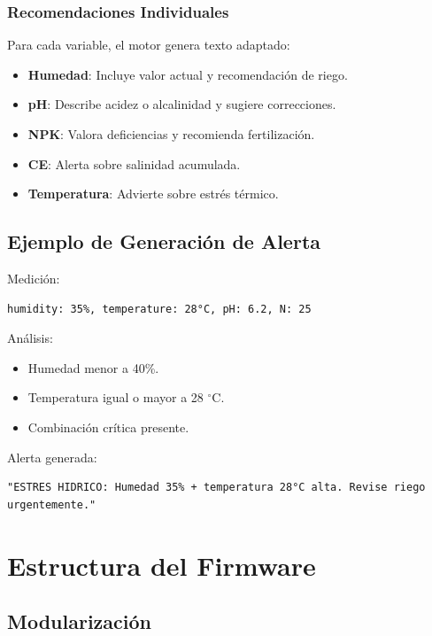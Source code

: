 \documentclass[journal]{IEEEtran}
\begin{document}
\subsubsection{Recomendaciones Individuales}

Para cada variable, el motor genera texto adaptado:

\begin{itemize}
\item \textbf{Humedad}: Incluye valor actual y recomendación de riego.
\item \textbf{pH}: Describe acidez o alcalinidad y sugiere correcciones.
\item \textbf{NPK}: Valora deficiencias y recomienda fertilización.
\item \textbf{CE}: Alerta sobre salinidad acumulada.
\item \textbf{Temperatura}: Advierte sobre estrés térmico.
\end{itemize}

\subsection{Ejemplo de Generación de Alerta}

Medición:

\begin{lstlisting}[basicstyle=\ttfamily\scriptsize,breaklines=true]
humidity: 35%, temperature: 28°C, pH: 6.2, N: 25
\end{lstlisting}

Análisis:

\begin{itemize}
\item Humedad menor a 40\%.
\item Temperatura igual o mayor a 28 $^\circ$C.
\item Combinación crítica presente.
\end{itemize}

Alerta generada:

\begin{lstlisting}[basicstyle=\ttfamily\scriptsize,breaklines=true]
"ESTRES HIDRICO: Humedad 35% + temperatura 28°C alta. Revise riego urgentemente."
\end{lstlisting}

\section{Estructura del Firmware}

\subsection{Modularización}
\end{document}
